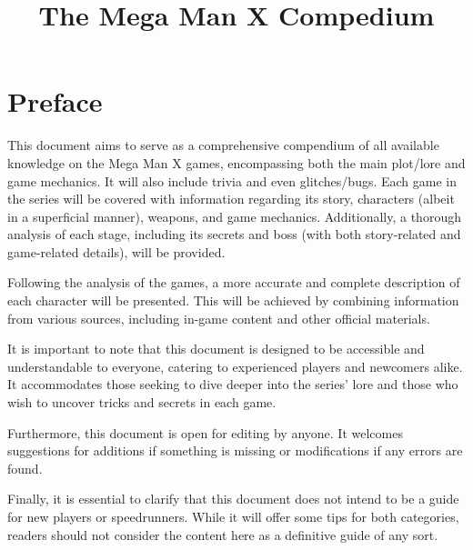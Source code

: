\documentclass[openany]{report}
\title{The Mega Man X Compedium}
\begin{document}
\begin{titlepage}
	\maketitle
	\thispagestyle{empty}
\end{titlepage}

\tableofcontents
	\section*{Preface}
	This document aims to serve as a comprehensive compendium of all available knowledge on the Mega Man X games, encompassing both the main plot/lore and game mechanics. It will also include trivia and even glitches/bugs. Each game in the series will be covered with information regarding its story, characters (albeit in a superficial manner), weapons, and game mechanics. Additionally, a thorough analysis of each stage, including its secrets and boss (with both story-related and game-related details), will be provided.
	
	Following the analysis of the games, a more accurate and complete description of each character will be presented. This will be achieved by combining information from various sources, including in-game content and other official materials.
	
	It is important to note that this document is designed to be accessible and understandable to everyone, catering to experienced players and newcomers alike. It accommodates those seeking to dive deeper into the series' lore and those who wish to uncover tricks and secrets in each game.
	
	Furthermore, this document is open for editing by anyone. It welcomes suggestions for additions if something is missing or modifications if any errors are found.
	
	Finally, it is essential to clarify that this document does not intend to be a guide for new players or speedrunners. While it will offer some tips for both categories, readers should not consider the content here as a definitive guide of any sort.
	
\end{document}
